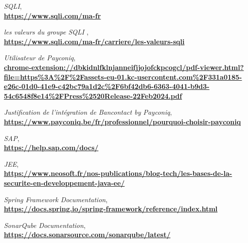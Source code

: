 
\renewcommand{\bibname}{Références}

\begin{thebibliography}{99}
    \emph{SQLI},\\
    \href{https://www.sqli.com/ma-fr}{\textbf{https://www.sqli.com/ma-fr}}
    
    \emph{les valeurs du groupe SQLI },\\
    \href{https://www.sqli.com/ma-fr/carriere/les-valeurs-sqli}{\textbf{https://www.sqli.com/ma-fr/carriere/les-valeurs-sqli}}
    
    \emph{Utilisateur de Payconiq}, \\
    \href{chrome-extension://dbkidnlfklnjanneifjjojofckpcogcl/pdf-viewer.html?file=https%3A%2F%2Fassets-eu-01.kc-usercontent.com%2F331a0185-e26c-01d0-41e9-c42bc79a1d2c%2F6bf42db6-6363-4041-b9d3-54c6548f8e14%2FPress%2520Release-22Feb2024.pdf}{\textbf{chrome-extension://dbkidnlfklnjanneifjjojofckpcogcl/pdf-viewer.html?file=https\%3A\%2F\%2Fassets-eu-01.kc-usercontent.com\%2F331a0185-e26c-01d0-41e9-c42bc79a1d2c\%2F6bf42db6-6363-4041-b9d3-54c6548f8e14\%2FPress\%2520Release-22Feb2024.pdf}}
    
    \emph{ Justification de l’intégration de Bancontact by Payconiq},\\
    \href{https://www.payconiq.be/fr/professionnel/pourquoi-choisir-payconiq}{\textbf{https://www.payconiq.be/fr/professionnel/pourquoi-choisir-payconiq}}

    \emph{SAP},\\
    \href{https://help.sap.com/docs/}{\textbf{https://help.sap.com/docs/}}

    \emph{JEE}, \\
    \href{https://www.neosoft.fr/nos-publications/blog-tech/les-bases-de-la-securite-en-developpement-java-ee/}{\textbf{https://www.neosoft.fr/nos-publications/blog-tech/les-bases-de-la-securite-en-developpement-java-ee/}}
   

    \emph{Spring Framework Documentation}, \\
    \href{https://docs.spring.io/spring-framework/reference/index.html}{\textbf{https://docs.spring.io/spring-framework/reference/index.html}}

    \emph{SonarQube Documentation}, \\
    \href{https://docs.sonarsource.com/sonarqube/latest/}{\textbf{https://docs.sonarsource.com/sonarqube/latest/}}


\end{thebibliography}

